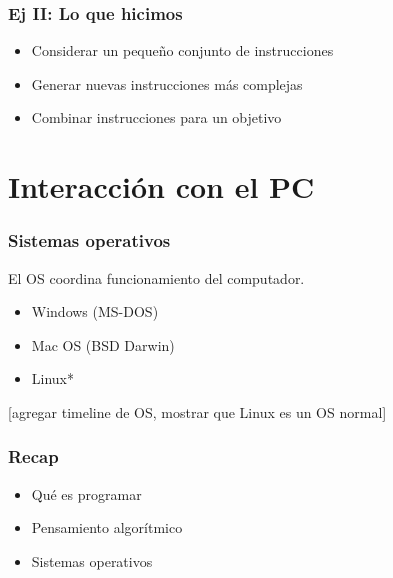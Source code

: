 \documentclass[14pt,aspectratio=169,xcolor=dvipsnames]{beamer}
\begin{document}
\begin{frame}\frametitle{Ej II: Lo que hicimos}
    \begin{itemize}
        \item Considerar un pequeño conjunto de instrucciones
        \item Generar nuevas instrucciones más complejas
        \item Combinar instrucciones para un objetivo
    \end{itemize}
\end{frame}
\section{Interacción con el PC}
\begin{frame}\frametitle{Sistemas operativos}
El OS coordina funcionamiento del computador. 
    \begin{itemize}
        \item Windows (MS-DOS)
        \item Mac OS (BSD Darwin)
        \item Linux*
    \end{itemize}

[agregar timeline de OS, mostrar que Linux es un OS normal]
\end{frame}
\begin{frame}\frametitle{Recap}
    \begin{itemize}
        \item Qué es programar
        \item Pensamiento algorítmico
        \item Sistemas operativos
    \end{itemize}
\end{frame}
\begin{frame}
    \maketitle
\end{frame}
\end{document}
